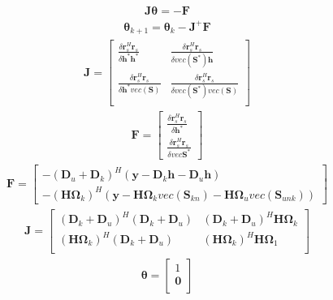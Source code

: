 \begin{align}
\mathbf{J}\mathbf{\theta}=-\mathbf{F}
\label{ce_n_1}
\end{align}
\begin{align}
\mathbf{\theta}_{k+1}=\mathbf{\theta}_{k}-\mathbf{J}^+\mathbf{F}
\label{ce_n_2}
\end{align}
\begin{align}
\mathbf{J}=\begin{bmatrix}
\frac{\delta\mathbf{r}_s^H\mathbf{r}_s}{\delta\mathbf{h}^*\mathbf{h}^*}&\frac{\delta\mathbf{r}_s^H\mathbf{r}_s}{\delta vec(\mathbf{S}^*)\mathbf{h}}\\
\frac{\delta\mathbf{r}_s^H\mathbf{r}_s}{\delta\mathbf{h}^*vec(\mathbf{S})}&\frac{\delta\mathbf{r}_s^H\mathbf{r}_s}{\delta vec(\mathbf{S}^*)vec(\mathbf{S})}\\
\end{bmatrix}
\label{ce_n_3}
\end{align}
\begin{align}
\mathbf{F}=\begin{bmatrix}
\frac{\delta\mathbf{r}_s^H\mathbf{r}_s}{\delta\mathbf{h}^*}\\
\frac{\delta\mathbf{r}_s^H\mathbf{r}_s}{\delta vec{\mathbf{S}}^*}
\end{bmatrix}
\label{ce_n_4}
\end{align}
\begin{align}
\mathbf{F}=\begin{bmatrix}
-(\mathbf{D}_u+\mathbf{D}_k)^H(\mathbf{y}-\mathbf{D}_k\mathbf{h}-\mathbf{D}_u\mathbf{h})\\
-(\mathbf{H}\mathbf{\Omega}_k)^H(\mathbf{y}-\mathbf{H}\mathbf{\Omega}_kvec(\mathbf{S}_{kn})-\mathbf{H}\mathbf{\Omega}_u vec(\mathbf{S}_{unk}))
\end{bmatrix}
\label{ce_n_5}
\end{align}
\begin{align}
\mathbf{J}=\begin{bmatrix}
(\mathbf{D}_k+\mathbf{D}_u)^H(\mathbf{D}_k+\mathbf{D}_u) &(\mathbf{D}_k+\mathbf{D}_u)^H\mathbf{H\Omega}_k \\
(\mathbf{H\Omega}_k)^H(\mathbf{D}_k+\mathbf{D}_u)&(\mathbf{H\Omega}_k)^H\mathbf{H\Omega}_1\\
\end{bmatrix}
\label{ce_n_5}
\end{align}
\begin{align}
\mathbf{\theta}=\begin{bmatrix}
1\\
\mathbf{0}\\
\end{bmatrix}
\label{ce_n_6}
\end{align}
